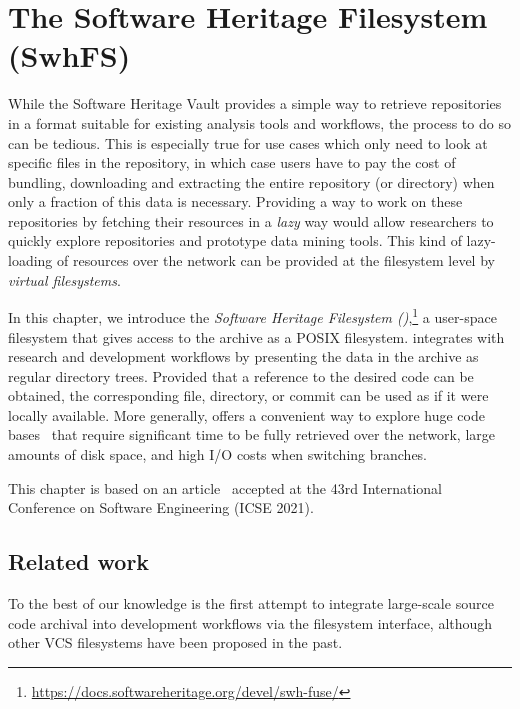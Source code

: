\chapter{The Software Heritage Filesystem (SwhFS)}%
\label{chp:fuse}

While the Software Heritage Vault provides a simple way to retrieve
repositories in a format suitable for existing analysis tools and workflows,
the process to do so can be tedious. This is especially true for use cases
which only need to look at specific files in the repository, in which case
users have to pay the cost of bundling, downloading and extracting the entire
repository (or directory) when only a fraction of this data is necessary.
Providing a way to work on these repositories by fetching their resources in a
\emph{lazy} way would allow researchers to quickly explore repositories and
prototype data mining tools. This kind of lazy-loading of resources over the
network can be provided at the filesystem level by \emph{virtual filesystems}.

In this chapter, we introduce the \emph{Software Heritage Filesystem
  (\SWHFS)},\footnote{\url{https://docs.softwareheritage.org/devel/swh-fuse/}}
  a user-space filesystem that gives access to the \SWH{} archive as a POSIX
  filesystem. \SWHFS{} integrates with research and development workflows by
presenting the data in the archive as regular directory trees.
Provided that a reference to the desired code can be obtained, the
corresponding file, directory, or commit can be used as if it were locally
available. More generally, \SWHFS{} offers a convenient way to explore huge
code bases~\cite{msscalar, msvfsforgit} that require significant time to be
fully retrieved over the network, large amounts of disk space, and high I/O
costs when switching branches.

\vspace{0.5cm}

This chapter is based on an article~\cite{swh-2021-swhfs}
accepted at the 43rd International Conference on Software Engineering (ICSE
2021).

\section{Related work}

To the best of our knowledge \SWHFS{} is the first attempt to integrate
large-scale source code archival into development workflows via the filesystem
interface, although other VCS filesystems have been proposed in the past.

